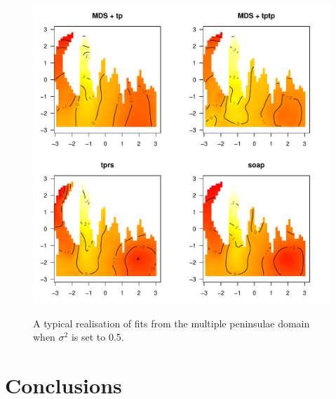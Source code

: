 \documentclass[a4paper,10pt]{article}
\begin{document}
\begin{figure}
\centering
\includegraphics[width=6in]{figs/wt2-fit-05.pdf} \\
\caption{A typical realisation of fits from the multiple peninsulae domain when $\sigma^2$ is set to 0.5.}
\label{wt2-fit-0.5}
\end{figure}



\section{Conclusions}
\end{document}
